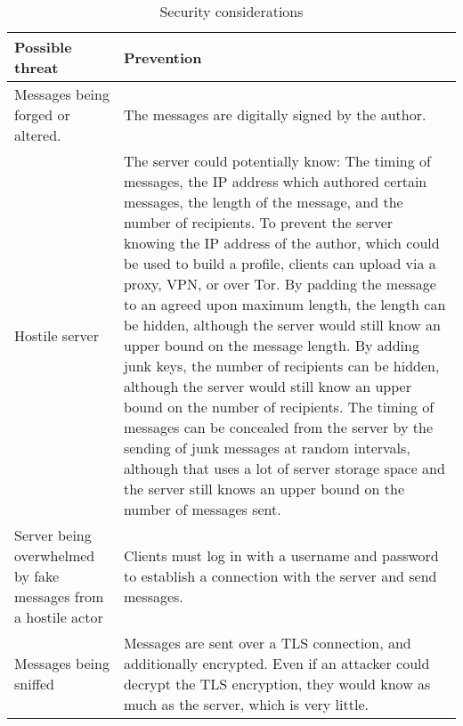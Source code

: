 \documentclass{article}
\begin{document}
\begin{table}[H]
    \centering
    \caption{Security considerations}
    \vspace{0.2cm}
    \begin{tabular}{p{}p{}}
    \toprule
    \textbf{Possible threat} & \textbf{Prevention}\\
    \midrule
    Messages being forged or altered. & The messages are digitally signed by the author.\\
    \midrule
    Hostile server & The server could potentially know: The timing of messages, the IP address which authored certain messages, the length of the message, and the number of recipients. To prevent the server knowing the IP address of the author, which could be used to build a profile, clients can upload via a proxy, VPN, or over Tor. By padding the message to an agreed upon maximum length, the length can be hidden, although the server would still know an upper bound on the message length. By adding junk keys, the number of recipients can be hidden, although the server would still know an upper bound on the number of recipients. The timing of messages can be concealed from the server by the sending of junk messages at random intervals, although that uses a lot of server storage space and the server still knows an upper bound on the number of messages sent.\\
    \midrule
    Server being overwhelmed by fake messages from a hostile actor & Clients must log in with a username and password to establish a connection with the server and send messages.\\
    \midrule
    Messages being sniffed & Messages are sent over a TLS connection, and additionally encrypted. Even if an attacker could decrypt the TLS encryption, they would know as much as the server, which is very little.\\
    \bottomrule
    \end{tabular}
    \label{tab:secconssend}
\end{table}
\end{document}
